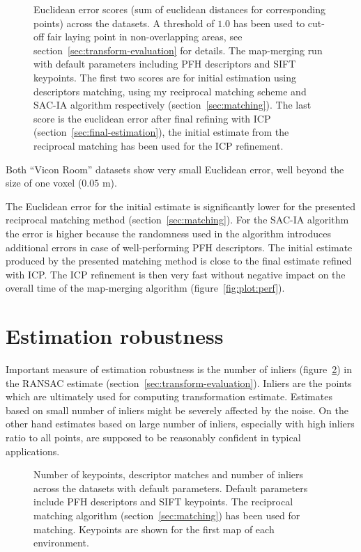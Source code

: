 \begin{figure}
  \centering
  
  \caption{Euclidean error scores (sum of euclidean distances for corresponding points) across the datasets. A threshold of $1.0$ has been used to cut-off fair laying point in non-overlapping areas, see section~\ref{sec:transform-evaluation} for details. The map-merging run with default parameters including \gls{PFH} descriptors and \gls{SIFT} keypoints. The first two scores are for initial estimation using descriptors matching, using my reciprocal matching scheme and \gls{SAC-IA} algorithm respectively (section~\ref{sec:matching}). The last score is the euclidean error after final refining with \gls{ICP} (section~\ref{sec:final-estimation}), the initial estimate from the reciprocal matching has been used for the \gls{ICP} refinement.}
  \label{fig:plot:euc_dist}
\end{figure}

Both ``Vicon Room'' datasets show very small Euclidean error, well beyond the size of one voxel ($0.05$ m).

The Euclidean error for the initial estimate is significantly lower for the presented reciprocal matching method (section~\ref{sec:matching}). For the \gls{SAC-IA} algorithm the error is higher because the randomness used in the algorithm introduces additional errors in case of well-performing \gls{PFH} descriptors. The initial estimate produced by the presented matching method is close to the final estimate refined with \gls{ICP}. The \gls{ICP} refinement is then very fast without negative impact on the overall time of the map-merging algorithm (figure~\ref{fig:plot:perf}).

\section{Estimation robustness}

Important measure of estimation robustness is the number of inliers (figure~\ref{fig:plot:inliers}) in the \gls{RANSAC} estimate (section~\ref{sec:transform-evaluation}). Inliers are the points which are ultimately used for computing transformation estimate. Estimates based on small number of inliers might be severely affected by the noise. On the other hand estimates based on large number of inliers, especially with high inliers ratio to all points, are supposed to be reasonably confident in typical applications.

\begin{figure}
  \centering
  
  \caption{Number of keypoints, descriptor matches and number of inliers across the datasets with default parameters. Default parameters include \gls{PFH} descriptors and \gls{SIFT} keypoints. The reciprocal matching algorithm (section~\ref{sec:matching}) has been used for matching. Keypoints are shown for the first map of each environment.}
  \label{fig:plot:inliers}
\end{figure}

